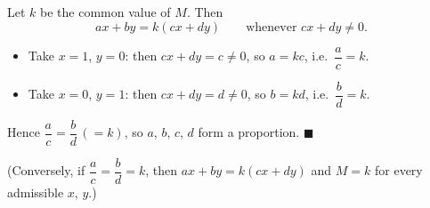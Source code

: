 Let $k$ be the common value of $M$. Then
\[
ax+by=k(cx+dy)\qquad\text{whenever } cx+dy\ne0 .
\]
\begin{itemize}
\item Take $x=1$, $y=0$: then $cx+dy=c\ne0$, so $a=kc$, i.e.\ $\dfrac {a}{c}=k$.
\item Take $x=0$, $y=1$: then $cx+dy=d\ne0$, so $b=kd$, i.e.\ $\dfrac {b}{d}=k$.
\end{itemize}
Hence $\boxed{\dfrac {a}{c}=\dfrac {b}{d}}\,(=k)$, so $a$, $b$, $c$, $d$ form a proportion. $\blacksquare$

(Conversely, if $\dfrac {a}{c}=\dfrac {b}{d}=k$, then $ax+by=k(cx+dy)$ and $M=k$ for every admissible $x$, $y$.)
